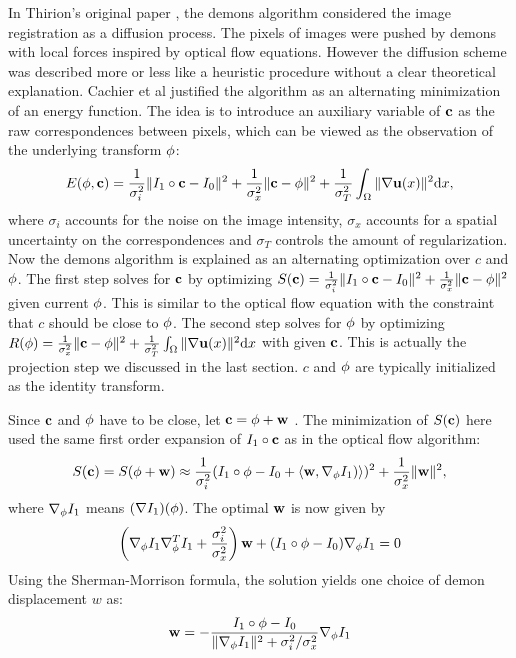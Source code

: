 \documentclass[letterpaper,12pt]{article}
\begin{document}
In Thirion's original paper \cite{Thirion98}, the demons algorithm considered the image registration as a diffusion process. The pixels of images were pushed by demons with local forces inspired by optical flow equations. However the diffusion scheme was described more or less like a heuristic procedure without a clear theoretical explanation. Cachier et al \cite{Cachier2003} justified the algorithm as an alternating minimization of an energy function. The idea is to introduce an auxiliary variable of $\mathbf{c}$ as the raw correspondences between pixels, which can be viewed as the observation of the underlying transform $\phi$:
\begin{align}
E(\phi,\mathbf{c})= \frac{1}{\sigma_i^2}\| I_1 \circ \mathbf{c} - I_0 \|^2
+\frac{1}{\sigma_x^2} \|\mathbf{c} - \phi\|^2
+\frac{1}{\sigma_T^2} \int_\Omega \| \nabla\mathbf{u}(x)\|^2 \text{d} x,
\end{align}
where $\sigma_i$ accounts for the noise on the image intensity, $\sigma_x$ accounts for a spatial uncertainty on the correspondences and $\sigma_T$ controls the amount of regularization. Now the demons algorithm is explained as an alternating optimization over $c$ and $\phi$. The first step solves for $\mathbf{c}$ by optimizing $S(\mathbf{c}) = \frac{1}{\sigma_i^2}\| I_1 \circ \mathbf{c} - I_0 \|^2 +\frac{1}{\sigma_x^2} \|\mathbf{c} - \phi\|^2 $ given current $\phi$. 
This is similar to the optical flow equation with the constraint that $c$ should be close to $\phi$. 
The second step solves for $\phi$ by optimizing $R(\phi) = \frac{1}{\sigma_x^2} \|\mathbf{c} - \phi\|^2+\frac{1}{\sigma_T^2} \int_\Omega \| \nabla\mathbf{u}(x)\|^2 \text{d} x$ with given $\mathbf{c}$. 
This is actually the projection step we discussed in the last
section. $c$ and $\phi$ are typically initialized as the identity transform.

Since $\mathbf{c}$ and $\phi$ have to be close, let $\mathbf{c} = \phi + \mathbf{w}$ . The minimization of $S(\mathbf{c})$ here used the same first order expansion of $I_1 \circ \mathbf{c} $ as in the optical flow algorithm:
\begin{align}
S(\mathbf{c}) = S(\phi+\mathbf{w}) \approx
\frac{1}{\sigma_i^2} ( I_1 \circ \phi - I_0 + \langle \mathbf{w}, \nabla_{\phi} I_1 ) \rangle )^2 
+ \frac{1}{\sigma_x^2} \| \mathbf{w} \|^2,
\end{align}
where $\nabla_{\phi}I_1$ means $(\nabla I_1)(\phi)$. The optimal $\mathbf{w}$ is now given by 
\begin{align}
\left( \nabla_{\phi}I_1 \nabla_{\phi}^T I_1 
      + \frac{\sigma_i^2}{\sigma_x^2}  
\right) \mathbf{w} 
+ (I_1 \circ \phi - I_0 )\nabla_{\phi}I_1 = 0
\end{align}
Using the Sherman-Morrison formula, the solution yields one choice of demon displacement $w$ as:
\begin{align}
\mathbf{w} = -\frac{I_1 \circ \phi - I_0 }
           {\|\nabla_{\phi}I_1\|^2 + {\sigma_i^2}/{\sigma_x^2}}
           \nabla_{\phi}I_1
\label{eq:adddemonforce}           
\end{align}
\end{document}
